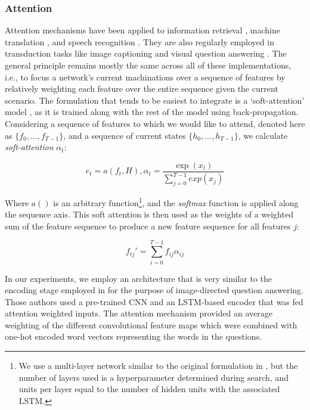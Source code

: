 \documentclass[utf8]{frontiersSCNS} %
\begin{document}
\subsubsection{Attention}


Attention mechanisms have been applied to information retrieval \cite{Moritz}, machine translation \cite{machine_translation}, and speech recognition \cite{Bahdanau}. They are also regularly employed in transduction tasks like image captioning \cite{XuKELVINXU, etc.} and visual question answering \cite{}. The general principle remains mostly the same across all of these implementations, i.e., to focus a network's current machinations over a sequence of features by relatively weighting each feature over the entire sequence given the current scenario. The formulation that tends to be easiest to integrate is a `soft-attention' model \cite{XuKELVINXU}, as it is trained along with the rest of the model using back-propagation. Considering a sequence of features to which we would like to attend, denoted here as $\{f_0, ..., f_{T-1}\}$, and a sequence of current states $\{h_0,...,h_{T-1}\}$, we calculate \emph{soft-attention} $\alpha_t$: 

\begin{equation} \label{eq:attn_nrg}
  e_{t} = a(f_{t}, H) , \alpha_t =  \frac{\exp(x_{t})}{\sum_{j=0}^{T-1}exp(x_{j})}
\end{equation}

Where $a()$ is an arbitrary function\footnote{We use a multi-layer network similar to the original formulation in \cite{XuKELVINXU}, but the number of layers used is a hyperparameter determined during search, and units per layer equal to the number of hidden units with the associated LSTM.}, and the \emph{softmax} function is applied along the sequence axis. This soft attention is then used as the weights of a weighted sum of the feature sequence to produce a new feature sequence for all features $j$: 

\begin{equation} \label{eq:attn}
    f_{tj}' = \sum_{i=0}^{T-1} f_{ij} \alpha_{ij}
  \end{equation}

In our experiments, we employ an architecture that is very similar to the encoding stage employed in \cite{Zhu} for the purpose of image-directed question answering. Those authors used a pre-trained CNN and an LSTM-based encoder that was fed attention weighted inputs. The attention mechanism provided an average weighting of the different convolutional feature maps which were combined with one-hot encoded word vectors representing the words in the questions.
\end{document}
